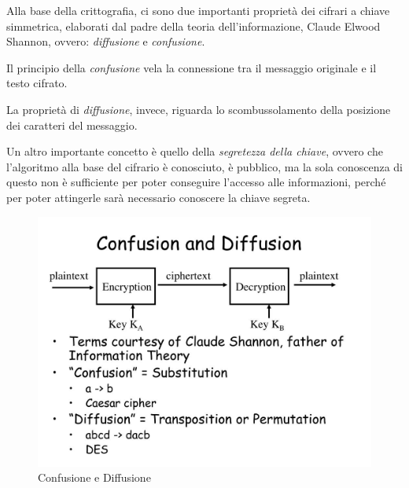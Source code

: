\textsf{\small Alla base della crittografia, ci sono due importanti proprietà dei cifrari a chiave simmetrica, elaborati dal padre della teoria dell'informazione, Claude Elwood Shannon, ovvero: \emph{diffusione} e \emph{confusione}.} \\

\textsf{\small Il principio della \emph{confusione} vela la connessione tra il messaggio originale e il testo cifrato.} %

\textsf{\small La proprietà di \emph{diffusione}, invece, riguarda lo scombussolamento della posizione dei caratteri del messaggio.} %

\textsf{\small Un altro importante concetto è quello della \emph{segretezza della chiave}, ovvero che l'algoritmo alla base del cifrario è conosciuto, è pubblico, ma la sola conoscenza di questo non è sufficiente per poter conseguire l'accesso alle informazioni, perché per poter attingerle sarà necessario conoscere la chiave segreta.} %

\begin{figure}[H]
	\centering
	\includegraphics[width=1\textwidth, height=1\textheight, keepaspectratio]{./images/theory_of_information/confusion-and-diffusion.png}
	\caption{Confusione e Diffusione}
	\label{fig:confusion_and_diffusion}
\end{figure}

